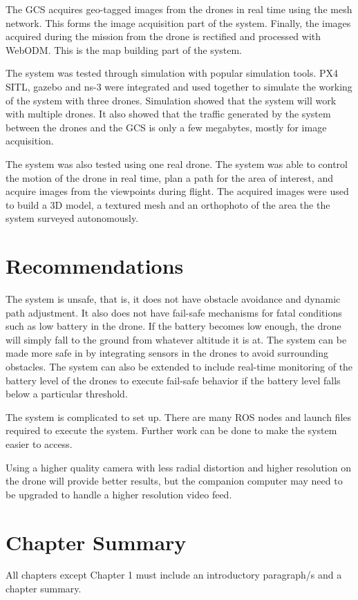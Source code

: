 The GCS acquires geo-tagged images from the drones in real time using the mesh network. This forms the image acquisition part of the system. 
Finally, the images acquired during the mission from the drone is rectified and processed with WebODM. This is the map building part of the system.

The system was tested through simulation with popular simulation tools. PX4 SITL, gazebo and ns-3 were integrated and used together to simulate the working of the system with three drones. Simulation showed that the system will work with multiple drones. It also showed that the traffic generated by the system between the drones and the GCS is only a few megabytes, mostly for image acquisition. 

The system was also tested using one real drone. The system was able to control the motion of the drone in real time, plan a path for the area of interest, and acquire images from the viewpoints during flight. The acquired images were used to build a 3D model, a textured mesh and an orthophoto of the area the the system surveyed autonomously. 


\section{Recommendations}

The system is unsafe, that is, it does not have obstacle avoidance and dynamic path adjustment. It also does not have fail-safe mechanisms for fatal conditions such as low battery in the drone. If the battery becomes low enough, the drone will simply fall to the ground from whatever altitude it is at. The system can be made more safe in by integrating sensors in the drones to avoid surrounding obstacles. The system can also be extended to include real-time monitoring of the battery level of the drones to execute fail-safe behavior if the battery level falls below a particular threshold.

The system is complicated to set up. There are many ROS nodes and launch files required to execute the system. Further work can be done to make the system easier to access.

Using a higher quality camera with less radial distortion and higher resolution on the drone will provide better results, but the companion computer may need to be upgraded to handle a higher resolution video feed. 


\section{Chapter Summary}
All chapters except Chapter 1 must include an introductory paragraph/s and a chapter summary.

\FloatBarrier
